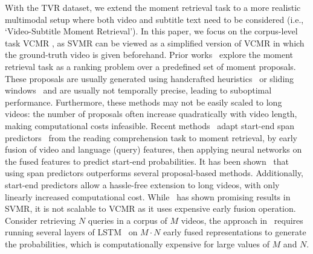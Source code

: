 \documentclass[runningheads]{llncs}
\begin{document}
With the TVR dataset, we extend the moment retrieval task to a more realistic multimodal setup where both video and subtitle text need to be considered (i.e., `Video-Subtitle Moment Retrieval'). In this paper, we focus on the corpus-level task VCMR 
, as SVMR can be viewed as a simplified version of VCMR in which the ground-truth video is given beforehand. 
Prior works~\cite{anne2017localizing,gao2017tall,hendricks2018localizing,xu2019multilevel,ge2019mac,escorcia2019temporal} explore the moment retrieval task as a ranking problem over a predefined set of moment proposals. These proposals are usually generated using handcrafted heuristics~\cite{anne2017localizing,hendricks2018localizing} or sliding windows~\cite{gao2017tall,xu2019multilevel,ge2019mac,escorcia2019temporal} and are usually not temporally precise, leading to suboptimal performance. 
Furthermore, these methods may not be easily scaled to long videos: the number of proposals often increase quadratically with video length, making computational costs infeasible. 
Recent methods~\cite{ghosh2019excl,lei2019tvqa+} adapt start-end span predictors~\cite{seo2016bidirectional,chen2017reading} from the reading comprehension task to moment retrieval, by early fusion of video and language (query) features, then applying neural networks on the fused features to predict start-end probabilities. 
It has been shown~\cite{ghosh2019excl} that using span predictors outperforms several proposal-based methods. 
Additionally, start-end predictors allow a hassle-free extension to long videos, with only linearly increased computational cost. 
While~\cite{ghosh2019excl} has shown promising results in SVMR, it is not scalable to VCMR as it uses expensive early fusion operation. 
Consider retrieving $N$ queries in a corpus of $M$ videos, the approach in~\cite{ghosh2019excl} requires running several layers of LSTM~\cite{hochreiter1997long} on $M \mbox{$\cdot$}N$ early fused representations to generate the probabilities, which is computationally expensive for large values of $M$ and $N$. 
\end{document}
